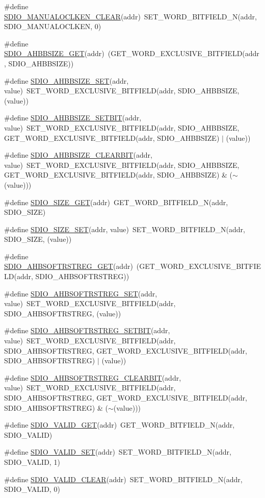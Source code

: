 \begin{DoxyCompactItemize}
\item 
\#define \hyperlink{a00570_a8bec8045787e4dc9774ee17149477bc1}{SDIO\_\-MANUALOCLKEN\_\-CLEAR}(addr)~SET\_\-WORD\_\-BITFIELD\_\-N(addr, SDIO\_\-MANUALOCLKEN, 0)
\item 
\#define \hyperlink{a00570_a8e1fc6cf6f95042ae1e28ff125e41e9f}{SDIO\_\-AHBBSIZE\_\-GET}(addr)~(GET\_\-WORD\_\-EXCLUSIVE\_\-BITFIELD(addr, SDIO\_\-AHBBSIZE))
\item 
\#define \hyperlink{a00570_ac3536c94468eb958256185ab9dc43058}{SDIO\_\-AHBBSIZE\_\-SET}(addr, value)~SET\_\-WORD\_\-EXCLUSIVE\_\-BITFIELD(addr, SDIO\_\-AHBBSIZE, (value))
\item 
\#define \hyperlink{a00570_ae5cf2760b72358e203070252835363b8}{SDIO\_\-AHBBSIZE\_\-SETBIT}(addr, value)~SET\_\-WORD\_\-EXCLUSIVE\_\-BITFIELD(addr, SDIO\_\-AHBBSIZE, GET\_\-WORD\_\-EXCLUSIVE\_\-BITFIELD(addr, SDIO\_\-AHBBSIZE) $|$ (value))
\item 
\#define \hyperlink{a00570_a9b9e3c2a0f517d120eb9e6d42a593dfb}{SDIO\_\-AHBBSIZE\_\-CLEARBIT}(addr, value)~SET\_\-WORD\_\-EXCLUSIVE\_\-BITFIELD(addr, SDIO\_\-AHBBSIZE, GET\_\-WORD\_\-EXCLUSIVE\_\-BITFIELD(addr, SDIO\_\-AHBBSIZE) \& ($\sim$(value)))
\item 
\#define \hyperlink{a00570_af69073e0025d79057faf94ff04bb88da}{SDIO\_\-SIZE\_\-GET}(addr)~GET\_\-WORD\_\-BITFIELD\_\-N(addr, SDIO\_\-SIZE)
\item 
\#define \hyperlink{a00570_a4b08cc98dc8da4263265252dde0981db}{SDIO\_\-SIZE\_\-SET}(addr, value)~SET\_\-WORD\_\-BITFIELD\_\-N(addr, SDIO\_\-SIZE, (value))
\item 
\#define \hyperlink{a00570_a2b512d97072bf4f2d46594963531f144}{SDIO\_\-AHBSOFTRSTREG\_\-GET}(addr)~(GET\_\-WORD\_\-EXCLUSIVE\_\-BITFIELD(addr, SDIO\_\-AHBSOFTRSTREG))
\item 
\#define \hyperlink{a00570_a5da498eab018318137636be7809ba64a}{SDIO\_\-AHBSOFTRSTREG\_\-SET}(addr, value)~SET\_\-WORD\_\-EXCLUSIVE\_\-BITFIELD(addr, SDIO\_\-AHBSOFTRSTREG, (value))
\item 
\#define \hyperlink{a00570_a58ed36cddf3ff6bb8469cbd8d46da413}{SDIO\_\-AHBSOFTRSTREG\_\-SETBIT}(addr, value)~SET\_\-WORD\_\-EXCLUSIVE\_\-BITFIELD(addr, SDIO\_\-AHBSOFTRSTREG, GET\_\-WORD\_\-EXCLUSIVE\_\-BITFIELD(addr, SDIO\_\-AHBSOFTRSTREG) $|$ (value))
\item 
\#define \hyperlink{a00570_acab946f2ab7769764104e090c0142db8}{SDIO\_\-AHBSOFTRSTREG\_\-CLEARBIT}(addr, value)~SET\_\-WORD\_\-EXCLUSIVE\_\-BITFIELD(addr, SDIO\_\-AHBSOFTRSTREG, GET\_\-WORD\_\-EXCLUSIVE\_\-BITFIELD(addr, SDIO\_\-AHBSOFTRSTREG) \& ($\sim$(value)))
\item 
\#define \hyperlink{a00570_aff903766289be1cee7eee8cc41c817b3}{SDIO\_\-VALID\_\-GET}(addr)~GET\_\-WORD\_\-BITFIELD\_\-N(addr, SDIO\_\-VALID)
\item 
\#define \hyperlink{a00570_a512cfd843577b1502a1e8ccaea302bd8}{SDIO\_\-VALID\_\-SET}(addr)~SET\_\-WORD\_\-BITFIELD\_\-N(addr, SDIO\_\-VALID, 1)
\item 
\#define \hyperlink{a00570_a0c24afeb0f19fc3c61652e893b910a04}{SDIO\_\-VALID\_\-CLEAR}(addr)~SET\_\-WORD\_\-BITFIELD\_\-N(addr, SDIO\_\-VALID, 0)
\end{DoxyCompactItemize}


